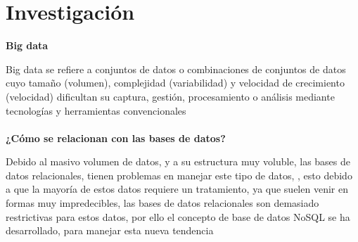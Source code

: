 \documentclass{article}
\begin{document}
\section{Investigación}
\textbf{Big data}\\\par
 Big data se refiere a conjuntos de datos o combinaciones de conjuntos de datos cuyo tamaño (volumen), complejidad (variabilidad) y velocidad de crecimiento (velocidad) dificultan su captura, gestión, procesamiento o análisis mediante tecnologías y herramientas convencionales\\
 \\ \textbf{¿Cómo se relacionan con las bases de datos?}\\\par
 Debido al masivo volumen de datos, y a su estructura muy voluble, las bases de datos relacionales, tienen problemas en manejar este tipo de datos, , esto debido a que la mayoría de estos datos requiere un tratamiento, ya que suelen venir en formas muy impredecibles, las bases de datos relacionales son demasiado restrictivas para estos datos, por ello el concepto de base de datos NoSQL se ha desarrollado, para manejar esta nueva tendencia
 
\end{document}
